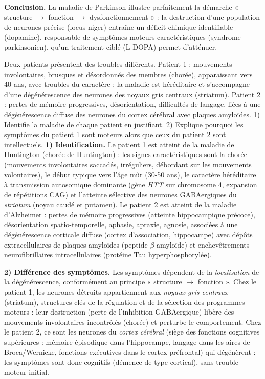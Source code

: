 \documentclass[11pt]{article}
\newcommand{\cle}[1]{{\popxbold\color{popdark}#1}}
\begin{document}
\begin{exoresolu}
\textbf{Conclusion.} La maladie de Parkinson illustre parfaitement la démarche « structure $\rightarrow$ fonction $\rightarrow$ dysfonctionnement » : la destruction d'une population de neurones précise (locus niger) entraîne un déficit chimique identifiable (dopamine), responsable de symptômes moteurs caractéristiques (syndrome parkinsonien), qu'un traitement ciblé (L-DOPA) permet d'atténuer.
\end{exoresolu}

\begin{exoresolu}
Deux patients présentent des troubles différents. Patient 1 : mouvements involontaires, brusques et désordonnés des membres (chorée), apparaissant vers 40 ans, avec troubles du caractère ; la maladie est héréditaire et s'accompagne d'une dégénérescence des neurones des noyaux gris centraux (striatum). Patient 2 : pertes de mémoire progressives, désorientation, difficultés de langage, liées à une dégénérescence diffuse des neurones du cortex cérébral avec plaques amyloïdes. 1) Identifie la maladie de chaque patient en justifiant. 2) Explique pourquoi les symptômes du patient 1 sont moteurs alors que ceux du patient 2 sont intellectuels.
\tcblower
\textbf{1) Identification.} Le patient 1 est atteint de la \cle{maladie de Huntington} (chorée de Huntington) : les signes caractéristiques sont la chorée (mouvements involontaires saccadés, irréguliers, débordant sur les mouvements volontaires), le début typique vers l'âge mûr (30-50 ans), le caractère héréditaire à transmission autosomique dominante (gène \emph{HTT} sur chromosome 4, expansion de répétitions CAG) et l'atteinte sélective des neurones GABAergiques du \emph{striatum} (noyau caudé et putamen). Le patient 2 est atteint de la \cle{maladie d'Alzheimer} : pertes de mémoire progressives (atteinte hippocampique précoce), désorientation spatio-temporelle, aphasie, apraxie, agnosie, associées à une dégénérescence corticale diffuse (cortex d'association, hippocampe) avec dépôts extracellulaires de plaques amyloïdes (peptide $\beta$-amyloïde) et enchevêtrements neurofibrillaires intracellulaires (protéine Tau hyperphosphorylée).

\textbf{2) Différence des symptômes.} Les symptômes dépendent de la \emph{localisation} de la dégénérescence, conformément au principe « structure $\rightarrow$ fonction ». Chez le patient 1, les neurones détruits appartiennent aux \emph{noyaux gris centraux} (striatum), structures clés de la régulation et de la sélection des programmes moteurs : leur destruction (perte de l'inhibition GABAergique) libère des mouvements involontaires incontrôlés (chorée) et perturbe le comportement. Chez le patient 2, ce sont les neurones du \emph{cortex cérébral} (siège des fonctions cognitives supérieures : mémoire épisodique dans l'hippocampe, langage dans les aires de Broca/Wernicke, fonctions exécutives dans le cortex préfrontal) qui dégénèrent : les symptômes sont donc cognitifs (démence de type cortical), sans trouble moteur initial.


\end{exoresolu}
\end{document}

